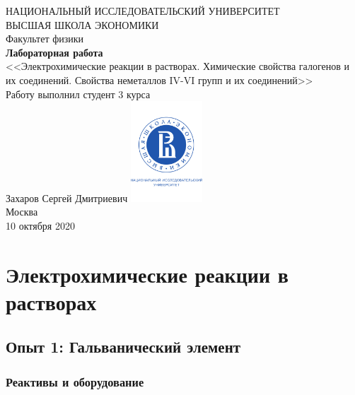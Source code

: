 \documentclass[a4paper, 12pt]{article}
\begin{document}
	\begin{titlepage}
		\begin{center}
			$$$$
			$$$$
			$$$$
			$$$$
			{\Large{НАЦИОНАЛЬНЫЙ ИССЛЕДОВАТЕЛЬСКИЙ УНИВЕРСИТЕТ}}\\
			\vspace{0.1cm}
			{\Large{ВЫСШАЯ ШКОЛА ЭКОНОМИКИ}}\\
			\vspace{0.25cm}
			{\large{Факультет физики}}\\
			\vspace{5.5cm}
			{\Huge\textbf{{Лабораторная работа}}}\\%
			\vspace{1cm}
			{\LARGE{<<Электрохимические реакции в растворах. Химические свойства галогенов и их соединений. Свойства неметаллов IV-VI групп и их соединений>>}}\\%
			\vspace{2cm}
			{Работу выполнил студент 3 курса}\\
			{Захаров Сергей Дмитриевич}
			\vfill
			\includegraphics[width = 0.2\textwidth]{HSElogo}\\
			\vfill
			Москва\\
			10 октября 2020
		\end{center}
	\end{titlepage}

\tableofcontents

\newpage


\section{Электрохимические реакции в растворах}

\subsection{Опыт 1: Гальванический элемент}

\subsubsection{Реактивы и оборудование}
\end{document}
